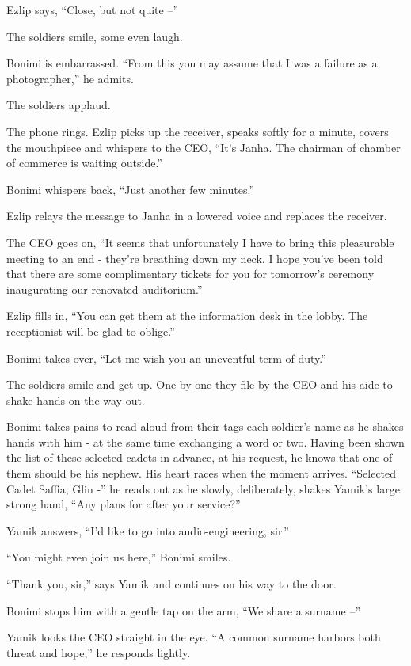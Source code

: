 \documentclass[twoside,11pt]{book}
\begin{document}
Ezlip says, ``Close, but not quite --''

The soldiers smile, some even laugh.

Bonimi is embarrassed. ``From this you may assume that I was a failure as a photographer,''
he admits.

The soldiers applaud.

The phone rings. Ezlip picks up the receiver, speaks softly for a minute, covers the mouthpiece and whispers to the CEO,
``It's Janha. The chairman of chamber of commerce is waiting outside.''

Bonimi whispers back, ``Just another few minutes.''

Ezlip relays the message to Janha in a lowered voice and replaces the receiver.

The CEO goes on, ``It seems that unfortunately I have to bring this pleasurable meeting to an end - they're
breathing down my neck. I hope you've been told that there are some complimentary tickets for you for
tomorrow's ceremony inaugurating our renovated auditorium.''

Ezlip fills in, ``You can get them at the information desk in the lobby. The receptionist will be glad to
oblige.''

Bonimi takes over, ``Let me wish you an uneventful term of duty.''

The soldiers smile and get up. One by one they file by the CEO and his aide to shake hands on the way out.

Bonimi takes pains to read aloud
from their tags each soldier's name as he shakes hands with him - at the same time exchanging a word or two. Having
been shown the list of these selected cadets in advance, at his request, he
knows that one of them should be his nephew. His heart races when the moment arrives. ``Selected Cadet Saffia, Glin -''
he reads out as he slowly, deliberately, shakes Yamik's large strong hand,
``Any plans for after your service?''

Yamik answers, ``I'd like to go into audio-engineering, sir.''

``You might even join us here,'' Bonimi smiles.

``Thank you, sir,'' says Yamik and continues on his way to the door.

Bonimi stops him with a gentle tap on the arm, ``We share a surname
--''

Yamik looks the CEO straight in the eye. ``A common surname harbors both threat and hope,'' he
responds lightly.
\end{document}
